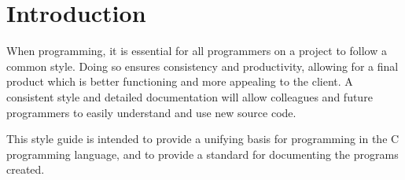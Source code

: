 \documentclass[StyleGuide.tex]{subfiles}
\begin{document}
\chapter*{Introduction}\label{ch:introduction}
When programming, it is essential for all programmers on a project to follow a
common style. Doing so ensures consistency and productivity, allowing for a
final product which is better functioning and more appealing to the client.
A consistent style and detailed documentation will allow colleagues and future
programmers to easily understand and use new source code.

This style guide is intended to provide a unifying basis for programming in the
C programming language, and to provide a standard for documenting the programs
created.
\end{document}
